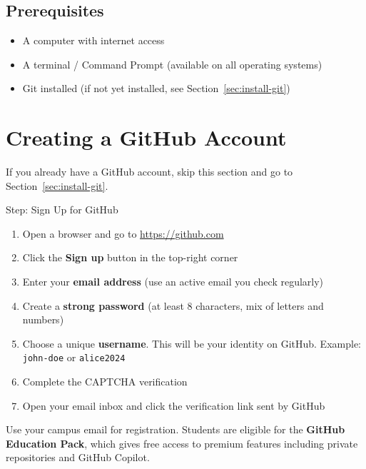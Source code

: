 \documentclass[
    a4paper,
    11pt,
    parskip=half
]{scrartcl}
\begin{document}
\subsection{Prerequisites}

\begin{itemize}
    \item A computer with internet access
    \item A terminal / Command Prompt (available on all operating systems)
    \item Git installed (if not yet installed, see Section~\ref{sec:install-git})
\end{itemize}

\section{Creating a GitHub Account}
\label{sec:github-account}

If you already have a GitHub account, skip this section and go to Section~\ref{sec:install-git}.

\begin{stepbox}{Step: Sign Up for GitHub}
\begin{enumerate}
    \item Open a browser and go to \url{https://github.com}
    \item Click the \textbf{Sign up} button in the top-right corner
    \item Enter your \textbf{email address} (use an active email you check regularly)
    \item Create a \textbf{strong password} (at least 8 characters, mix of letters and numbers)
    \item Choose a unique \textbf{username}. This will be your identity on GitHub.
          Example: \texttt{john-doe} or \texttt{alice2024}
    \item Complete the CAPTCHA verification
    \item Open your email inbox and click the verification link sent by GitHub
\end{enumerate}
\end{stepbox}

\begin{tipbox}
Use your campus email for registration. Students are eligible for the \textbf{GitHub Education Pack}, which gives free access to premium features including private repositories and GitHub Copilot.
\end{tipbox}
\end{document}
